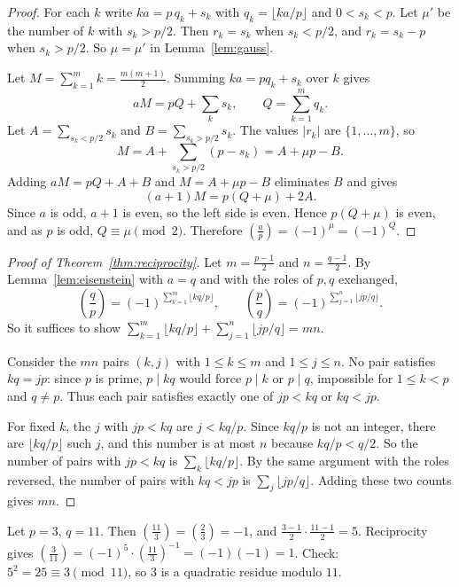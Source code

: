 \begin{proof}
For each $k$ write $ka=p\,q_k+s_k$ with $q_k=\lfloor ka/p\rfloor$ and $0<s_k<p$. Let $\mu'$ be the number of $k$ with $s_k>p/2$. Then $r_k=s_k$ when $s_k<p/2$, and $r_k=s_k-p$ when $s_k>p/2$. So $\mu=\mu'$ in Lemma~\ref{lem:gauss}.

Let $M=\sum_{k=1}^m k=\frac{m(m+1)}{2}$. Summing $ka=pq_k+s_k$ over $k$ gives
\[
  aM = pQ+\sum_k s_k,\qquad Q=\sum_{k=1}^m q_k.
\]
Let $A=\sum_{s_k<p/2}s_k$ and $B=\sum_{s_k>p/2}s_k$. The values $|r_k|$ are $\{1,\dots,m\}$, so
\[
  M = A + \sum_{s_k>p/2}(p-s_k) = A + \mu p - B.
\]
Adding $aM=pQ+A+B$ and $M=A+\mu p-B$ eliminates $B$ and gives
\[
  (a+1)M = p(Q+\mu)+2A.
\]
Since $a$ is odd, $a+1$ is even, so the left side is even. Hence $p(Q+\mu)$ is even, and as $p$ is odd, $Q\equiv\mu\pmod 2$. Therefore $\left(\frac{a}{p}\right)=(-1)^{\mu}=(-1)^{Q}$.
\end{proof}

\begin{proof}[Proof of Theorem~\ref{thm:reciprocity}]
Let $m=\frac{p-1}{2}$ and $n=\frac{q-1}{2}$. By Lemma~\ref{lem:eisenstein} with $a=q$ and with the roles of $p,q$ exchanged,
\[
  \left(\frac{q}{p}\right)=(-1)^{\sum_{k=1}^{m}\lfloor kq/p\rfloor},\qquad
  \left(\frac{p}{q}\right)=(-1)^{\sum_{j=1}^{n}\lfloor jp/q\rfloor}.
\]
So it suffices to show $\sum_{k=1}^{m}\lfloor kq/p\rfloor+\sum_{j=1}^{n}\lfloor jp/q\rfloor=mn$.

Consider the $mn$ pairs $(k,j)$ with $1\le k\le m$ and $1\le j\le n$. No pair satisfies $kq=jp$: since $p$ is prime, $p\mid kq$ would force $p\mid k$ or $p\mid q$, impossible for $1\le k<p$ and $q\ne p$. Thus each pair satisfies exactly one of $jp<kq$ or $kq<jp$.

For fixed $k$, the $j$ with $jp<kq$ are $j<kq/p$. Since $kq/p$ is not an integer, there are $\lfloor kq/p\rfloor$ such $j$, and this number is at most $n$ because $kq/p<q/2$. So the number of pairs with $jp<kq$ is $\sum_k\lfloor kq/p\rfloor$. By the same argument with the roles reversed, the number of pairs with $kq<jp$ is $\sum_j\lfloor jp/q\rfloor$. Adding these two counts gives $mn$.
\end{proof}

\begin{example}
Let $p=3$, $q=11$. Then $\left(\frac{11}{3}\right)=\left(\frac{2}{3}\right)=-1$, and $\frac{3-1}{2}\cdot\frac{11-1}{2}=5$. Reciprocity gives $\left(\frac{3}{11}\right)=(-1)^5\cdot\left(\frac{11}{3}\right)^{-1}=(-1)(-1)=1$. Check: $5^2=25\equiv 3\pmod{11}$, so $3$ is a quadratic residue modulo $11$.
\end{example}


